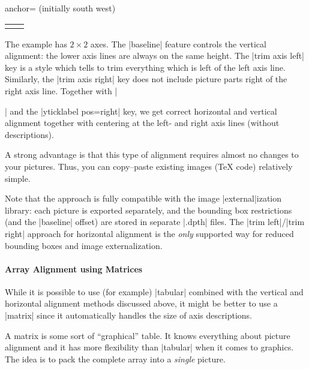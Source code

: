 \begin{pgfplotskey}{anchor= (initially south west)}
\begin{minipage}
\begin{tabular}
\begin{codeexample}[vbox]
\begin{center}
\begin{tabular}{rl}
\begin{tikzpicture}[baseline,trim axis right]
    \end{tikzpicture}
        \\
\end{tabular}
\end{center}
\end{codeexample}
    \noindent The example has $2 \times 2$ axes. The |baseline| feature
    controls the vertical alignment: the lower axis lines are always on the
    same height. The |trim axis left| key is a style which tells \Tikz{} to
    trim everything which is left of the left axis line. Similarly, the
    |trim axis right| key does not include picture parts right of the right
    axis line. Together with |\begin{center}| and the |yticklabel pos=right|
    key, we get correct horizontal and vertical alignment together with
    centering at the left- and right axis lines (without descriptions).

    A strong advantage is that this type of alignment requires almost no
    changes to your pictures. Thus, you can copy--paste existing images (\TeX{}
    code) relatively simple.

    Note that the approach is fully compatible with the image |external|ization
    library: each picture is exported separately, and the bounding box
    restrictions (and the |baseline| offset) are stored in separate |.dpth|
    files. The |trim left|/|trim right| approach for horizontal alignment is
    the \emph{only} supported way for reduced bounding boxes and image
    externalization.


    \paragraph{Array Alignment using \Tikz{} Matrices}

    While it is possible to use (for example) |tabular| combined with the
    vertical and horizontal alignment methods discussed above, it might be
    better to use a \Tikz{} |matrix| since it automatically handles the size of
    axis descriptions.

    A \Tikz{} matrix is some sort of ``graphical'' table. It knows everything
    about picture alignment and it has more flexibility than |tabular| when it
    comes to graphics. The idea is to pack the complete array into a
    \emph{single} picture.


\end{center}
\end{tabular}
\end{minipage}
\end{pgfplotskey}

